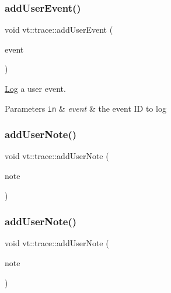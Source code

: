 \mbox{\label{namespacevt_1_1trace_ac973a9573bd3cc0a3fead674a4551ac5}} 
\subsubsection{\texorpdfstring{add\+User\+Event()}{addUserEvent()}\hspace{0.1cm}{\footnotesize\ttfamily [2/2]}}
{\footnotesize\ttfamily void vt\+::trace\+::add\+User\+Event (\begin{DoxyParamCaption}\item[{\hyperlink{namespacevt_1_1trace_a5908920d051c144c89f17c69ed262350}{User\+Event\+I\+D\+Type}}]{event }\end{DoxyParamCaption})}



\hyperlink{structvt_1_1trace_1_1_log}{Log} a user event. 


\begin{DoxyParams}[1]{Parameters}
\mbox{\tt in}  & {\em event} & the event ID to log \\
\hline
\end{DoxyParams}
\mbox{\label{namespacevt_1_1trace_ab2de61fae25783f0f209470372c8f6d8}} 
\subsubsection{\texorpdfstring{add\+User\+Note()}{addUserNote()}\hspace{0.1cm}{\footnotesize\ttfamily [1/2]}}
{\footnotesize\ttfamily void vt\+::trace\+::add\+User\+Note (\begin{DoxyParamCaption}\item[{\mbox{[}\mbox{[}maybe\+\_\+unused\mbox{]} \mbox{]} std\+::string const \&}]{note }\end{DoxyParamCaption})}

\mbox{\label{namespacevt_1_1trace_a40f3744bfeb2281ce300d12271f3d48c}} 
\subsubsection{\texorpdfstring{add\+User\+Note()}{addUserNote()}\hspace{0.1cm}{\footnotesize\ttfamily [2/2]}}
{\footnotesize\ttfamily void vt\+::trace\+::add\+User\+Note (\begin{DoxyParamCaption}\item[{std\+::string const \&}]{note }\end{DoxyParamCaption})}



